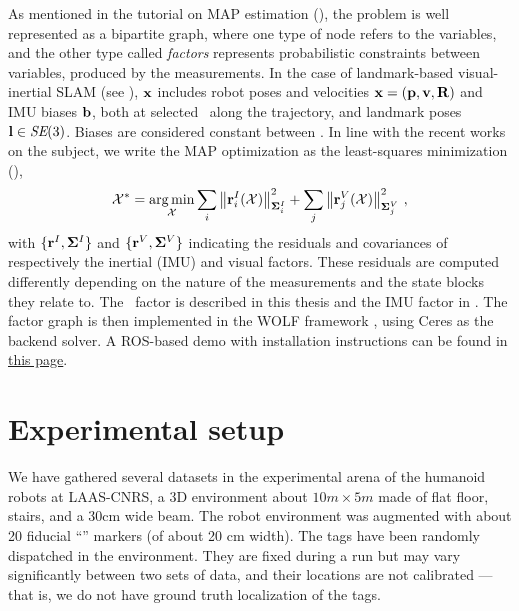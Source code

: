 As mentioned in the tutorial on MAP estimation (), the problem is well represented as a bipartite graph, where one type of node refers to the variables, 
and the other type called \emph{factors} represents probabilistic constraints between variables, produced by the measurements.
%
In the case of landmark-based visual-inertial SLAM (see ), ${\bf x}$ includes robot poses and velocities 
${\bf x}=({\bf p},{\bf v},{\bf R})$ and IMU biases ${\bf b}$, both at selected \keyframes\ along the trajectory, and landmark poses ${\bf l} \in \textit{SE}(3)$.
Biases are considered constant between \keyframes.
%
In line with the recent works on the subject, we write the MAP optimization as the least-squares minimization (),
%
\begin{align}\label{equ:least_squares}
    \mathcal{X}^* = \operatorname*{arg\,min}_{\mathcal{X}} 
    \sum_i {\left\|{\bf r}^I_i(\mathcal{X})\right\|}_{{\bm \Sigma}^I_i}^2
    +
    \sum_j {\left\|{\bf r}^V_j(\mathcal{X})\right\|}_{{\bm \Sigma}^V_j}^2
~,
\end{align}
%
with $\{{\bf r}^I,{\bm \Sigma}^I\}$ and $\{{\bf r}^V,{\bm \Sigma}^V\}$ indicating the residuals and covariances of respectively the inertial (IMU) and visual factors.
These residuals are computed differently depending on the nature of the measurements and the state blocks they relate to. 
The \apriltag\ factor is described in this thesis  and the IMU factor in .
The factor graph is then implemented in the WOLF framework \cite{sola2021wolf}, using Ceres \cite{ceres-solver} as the backend solver. 
A ROS-based demo with installation instructions can be found in \href{http://mobile_robotics.pages.iri.upc-csic.es/wolf_projects/wolf_lib/wolf-doc-sphinx/WOLF_demos/wolf_demo_apriltag_imu.html}{this page}.




\section{Experimental setup}
We have gathered several datasets in the experimental arena of the humanoid robots at LAAS-CNRS, a 3D environment about $10m \times 5m$ made of flat floor, 
stairs, and a 30cm wide beam.
The robot environment was augmented with about 20 fiducial ``\apriltag'' markers (of about 20 cm width).
The tags have been randomly dispatched in the environment.
They are fixed during a run but may vary significantly between two sets of data, and their locations are not calibrated ---that is, we do not have ground truth localization of the tags.

